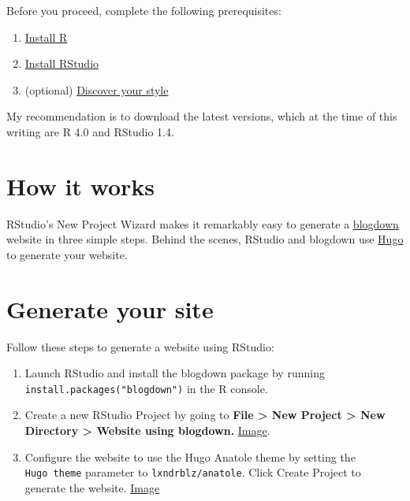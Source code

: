 \documentclass[
]{book}
\providecommand{\tightlist}{%
  \setlength{\itemsep}{0pt}\setlength{\parskip}{0pt}}
\begin{document}
Before you proceed, complete the following prerequisites:

\begin{enumerate}
\def\labelenumi{\arabic{enumi}.}
\tightlist
\item
  \href{https://cran.rstudio.com/}{Install R}
\item
  \href{https://www.rstudio.com/products/rstudio/download/\#download}{Install RStudio}
\item
  (optional) \protect\hyperlink{choose-theme}{Discover your style}
\end{enumerate}

My recommendation is to download the latest versions, which at the time of this writing are R 4.0 and RStudio 1.4.

\hypertarget{how-it-works-1}{%
\section{How it works}\label{how-it-works-1}}

RStudio's New Project Wizard makes it remarkably easy to generate a \href{https://bookdown.org/yihui/blogdown/}{blogdown} website in three simple steps. Behind the scenes, RStudio and blogdown use \href{https://gohugo.io/}{Hugo} to generate your website.

\hypertarget{generate-site}{%
\section{Generate your site}\label{generate-site}}

Follow these steps to generate a website using RStudio:

\begin{enumerate}
\def\labelenumi{\arabic{enumi}.}
\item
  Launch RStudio and install the blogdown package by running \texttt{install.packages("blogdown")} in the R console.
\item
  Create a new RStudio Project by going to \textbf{File \textgreater{} New Project \textgreater{} New Directory \textgreater{} Website using blogdown.} \href{https://i.imgur.com/eDg7V2k.png}{Image}.
\item
  Configure the website to use the Hugo Anatole theme by setting the \texttt{Hugo\ theme} parameter to \texttt{lxndrblz/anatole}. Click Create Project to generate the website. \href{https://i.imgur.com/0DxkDHe.png}{Image}
\end{enumerate}
\end{document}
